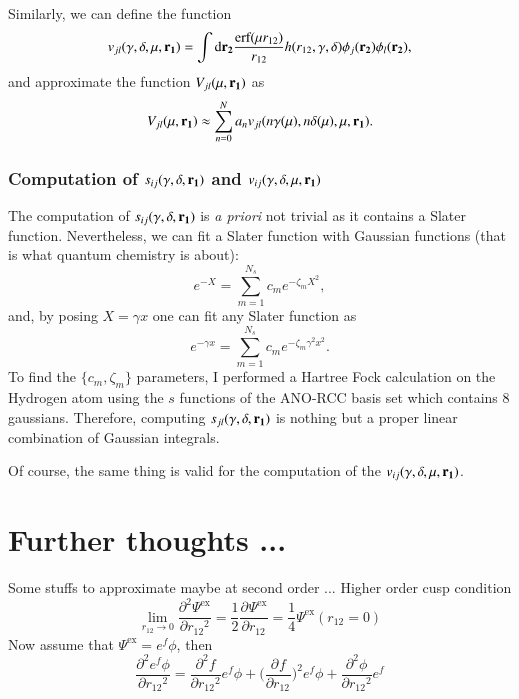 \documentclass[aip,jcp,reprint,noshowkeys,superscriptaddress]{revtex4-1}
\newcommand{\deriv}[3]{\frac{\partial^{#3} #1}{\partial {#2}^{#3}}}
\newcommand{\bd}[1]{{\bf {#1}}}
\newcommand{\dr}[1]{\text{d}{\bf {#1}}}
\newcommand{\psiex}[0]{\Psi^{\text{ex}}}
\begin{document}
Similarly, we can define the function 
\begin{equation} 
 \label{def_v_ij_atom}
 v_{jl}(\gamma,\delta,\mu,\bd{r_1}) = \int \dr{r_2} \frac{\text{erf}(\mu r_{12})}{r_{12}}h( r_{12}, \gamma,\delta) \phi_j(\bd{r_2}) \phi_l(\bd{r_2}), 
\end{equation}
and approximate the function $V_{jl}(\mu,\bd{r_1}) $ as
\begin{equation}
 \label{def_v_ij_dl}
 V_{jl}(\mu,\bd{r_1}) \approx \sum_{n=0}^{N}  a_n 
    v_{jl}(n  \gamma(\mu),n  \delta(\mu),\mu,\bd{r_1}).
\end{equation}

\subsubsection{Computation of $s_{ij}(\gamma,\delta,\bd{r_1})$ and $v_{ij}(\gamma,\delta,\mu,\bd{r_1})$}
The computation of $s_{ij}(\gamma,\delta,\bd{r_1})$ is \textit{a priori} not trivial as it contains a Slater function. 
Nevertheless, we can fit a Slater function with Gaussian functions (that is what quantum chemistry is about):
\begin{equation}
 e^{-X} = \sum_{m=1}^{N_s} c_m e^{-\zeta_m X^2}, 
\end{equation}
and, by posing $X=\gamma x$ one can fit any Slater function as
\begin{equation}
 e^{-\gamma x} = \sum_{m=1}^{N_s} c_m e^{-\zeta_m \gamma^2 x^2}. 
\end{equation}
To find the $\{c_m,\zeta_m\}$ parameters, I performed a Hartree Fock calculation on the Hydrogen atom using the $s$ functions of the ANO-RCC basis set which contains 8 gaussians.  
Therefore, computing $s_{jl}(\gamma,\delta,\bd{r_1})$ is nothing but a proper linear combination of Gaussian integrals. 

Of course, the same thing is valid for the computation of the $v_{ij}(\gamma,\delta,\mu,\bd{r_1})$. 

\section{Further thoughts ...}
Some stuffs to approximate maybe at second order ...
Higher order cusp condition
\begin{equation}
 \lim_{r_{12}\rightarrow 0}\deriv{\psiex}{r_{12}}{2} = \frac{1}{2} \deriv{\psiex}{r_{12}}{} = \frac{1}{4}\psiex(r_{12}=0)
\end{equation}
Now assume that $\psiex = e^{f}\phi$, then
\begin{equation}
 \deriv{e^{f}\phi }{r_{12}}{2} = \deriv{f}{r_{12}}{2} e^f \phi + \bigg(\deriv{f}{r_{12}}{} \bigg)^2 e^f\phi  
                               + \deriv{\phi}{r_{12}}{2}e^f
\end{equation}
\end{document}
